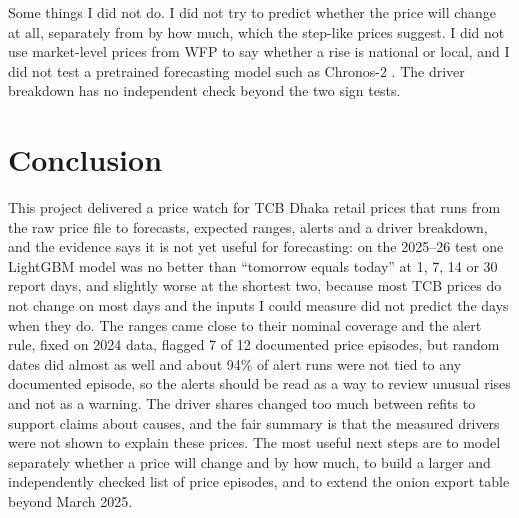 \documentclass[12pt]{report}
\begin{document}
Some things I did not do. I did not try to predict whether the price will change at all, separately from by how much, which the step-like prices suggest. I did not use market-level prices from WFP to say whether a rise is national or local, and I did not test a pretrained forecasting model such as Chronos-2 \cite{chronos2}. The driver breakdown has no independent check beyond the two sign tests.

\chapter{Conclusion}
This project delivered a price watch for TCB Dhaka retail prices that runs from the raw price file to forecasts, expected ranges, alerts and a driver breakdown, and the evidence says it is not yet useful for forecasting: on the 2025--26 test one LightGBM model was no better than ``tomorrow equals today'' at 1, 7, 14 or 30 report days, and slightly worse at the shortest two, because most TCB prices do not change on most days and the inputs I could measure did not predict the days when they do. The ranges came close to their nominal coverage and the alert rule, fixed on 2024 data, flagged 7 of 12 documented price episodes, but random dates did almost as well and about 94\% of alert runs were not tied to any documented episode, so the alerts should be read as a way to review unusual rises and not as a warning. The driver shares changed too much between refits to support claims about causes, and the fair summary is that the measured drivers were not shown to explain these prices. The most useful next steps are to model separately whether a price will change and by how much, to build a larger and independently checked list of price episodes, and to extend the onion export table beyond March 2025.

\begingroup
\let\clearpage\relax
\renewcommand{\bibname}{References}
\printbibliography
\endgroup
\end{document}
